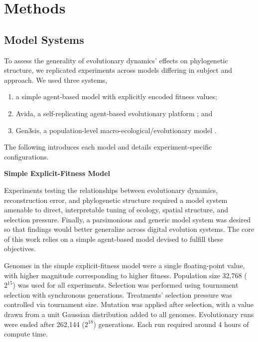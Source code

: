 \section{Methods}
\label{sec:methods}

\subsection{Model Systems}

To assess the generality of evolutionary dynamics' effects on phylogenetic structure, we replicated experiments across models differing in subject and approach.
We used three systems,
\begin{enumerate}
\item a simple agent-based model with explicitly encoded fitness values;
\item Avida, a self-replicating agent-based evolutionary platform \citep{ofria2004avida}; and
\item Gen3sis, a population-level macro-ecological/evolutionary model \citep{hagen2021gen3sis}.
\end{enumerate}

The following introduces each model and details experiment-specific configurations.

\noindent
\textbf{Simple Explicit-Fitness Model}

\noindent
Experiments testing the relationships between evolutionary dynamics, reconstruction error, and phylogenetic structure required a model system amenable to direct, interpretable tuning of ecology, spatial structure, and selection pressure.
Finally, a parsimonious and generic model system was desired so that findings would better generalize across digital evolution systems.
The core of this work relies on a simple agent-based model devised to fulfill these objectives.

Genomes in the simple explicit-fitness model were a single floating-point value, with higher magnitude corresponding to higher fitness.
Population size 32,768 ($2^{15}$) was used for all experiments.
Selection was performed using tournament selection with synchronous generations.
Treatments' selection pressure was controlled via tournament size.
Mutation was applied after selection, with a value drawn from a unit Gaussian distribution added to all genomes.
Evolutionary runs were ended after 262,144 ($2^{18}$) generations.
Each run required around 4 hours of compute time.

